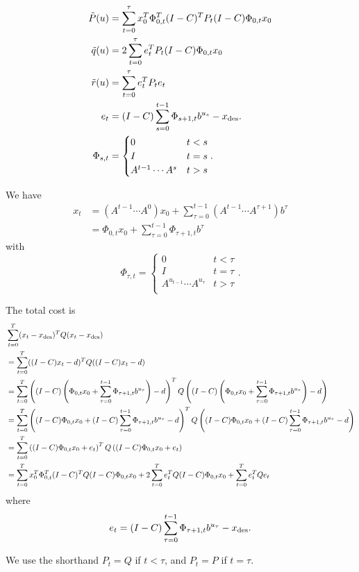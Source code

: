 \documentclass[12pt]{article}
\begin{document}
\begin{align*}
\tilde P(u) 
&= 
\sum_{t=0}^\tau 
x_0^T \Phi_{0,t}^T (I-C)^T P_t (I-C) \Phi_{0,t} x_0
\\
\tilde q(u) 
&= 
2 \sum_{t=0}^\tau e_t^T P_t (I-C) \Phi_{0,t} x_0
\\
\tilde r(u) 
&= 
\sum_{t=0}^\tau e_t^T P_t e_t
\\
e_t 
&= (I-C)\sum_{s=0}^{t-1} \Phi_{s+1,t} b^{u_s} - x_{\rm des}.
\\
\Phi_{s,t} 
&= 
\begin{cases}
0 & t < s \\
I & t = s \\
A^{t-1} \cdots A^{s} & t > s \\
\end{cases}.
\end{align*}
\begin{derivations}
We have
\begin{align*}
x_t 
&= 
\left( A^{t-1} \cdots A^0 \right)x_0
+ \sum_{\tau=0}^{t-1} \left( A^{t-1} \cdots A^{\tau+1} \right) b^\tau
\\&= \Phi_{0,t} x_0 + \sum_{\tau=0}^{t-1} \Phi_{\tau+1,t} b^\tau
\end{align*}
with
\[
\Phi_{\tau,t} = 
\begin{cases}
0 & t < \tau \\
I & t = \tau \\
A^{u_{t-1}} \cdots A^{u_{\tau}} & t > \tau \\
\end{cases}.
\]

The total cost is
\begin{align*}
&\sum_{t=0}^T (x_t - x_{\rm des})^T Q (x_t - x_{\rm des})
\\&=
\sum_{t=0}^T ((I - C)x_t - d)^T Q ((I - C)x_t - d)
\\&=
\sum_{t=0}^T 
\left( (I-C) \left( \Phi_{0,t} x_0 + \sum_{\tau=0}^{t-1} \Phi_{\tau+1,t} b^{u_\tau} \right) - d \right)^T
Q 
\left( (I-C) \left( \Phi_{0,t} x_0 + \sum_{\tau=0}^{t-1} \Phi_{\tau+1,t} b^{u_\tau} \right) - d \right)
\\&=
\sum_{t=0}^T 
\left( (I-C) \Phi_{0,t} x_0 + (I-C)\sum_{\tau=0}^{t-1} \Phi_{\tau+1,t} b^{u_\tau}  - d \right)^T
Q 
\left( (I-C) \Phi_{0,t} x_0 + (I-C)\sum_{\tau=0}^{t-1} \Phi_{\tau+1,t} b^{u_\tau}  - d \right)
\\&=
\sum_{t=0}^T 
\left( (I-C) \Phi_{0,t} x_0 + e_t \right)^T
Q 
\left( (I-C) \Phi_{0,t} x_0 + e_t \right)
\\&=
\sum_{t=0}^T 
x_0^T
\Phi_{0,t}^T
(I-C)^T
Q 
(I-C) \Phi_{0,t} x_0
+
2 \sum_{t=0}^T e_t^T Q (I-C) \Phi_{0,t} x_0
+ \sum_{t=0}^T e_t^T Q e_t
\end{align*}
where
\[
e_t = 
(I-C)\sum_{\tau=0}^{t-1} \Phi_{\tau+1,t} b^{u_\tau} - x_{\rm des}.
\]
\end{derivations}
We use the shorthand $P_t = Q$ if $t < \tau$,
and $P_t = P$ if $t = \tau$.
\end{document}
